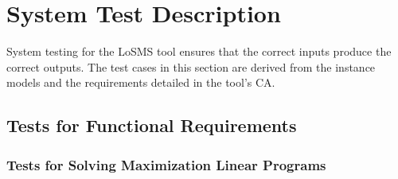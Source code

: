 \documentclass[12pt, titlepage]{article}
\newcommand{\famname}{LoSMS} %
\begin{document}
\section{System Test Description} \label{SystemTestDescription}

System testing for the \famname{} tool ensures that the correct inputs produce 
the correct outputs. The test cases in this section are derived from the 
instance models and the requirements detailed in the tool's CA.
	
\subsection{Tests for Functional Requirements}

\subsubsection{Tests for Solving Maximization Linear Programs}
\end{document}
